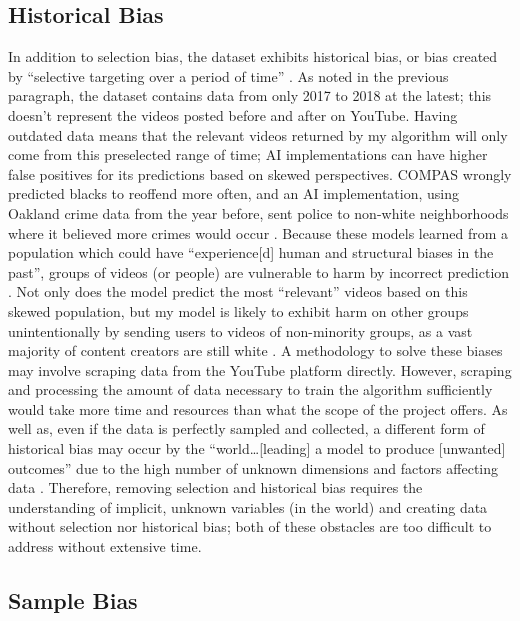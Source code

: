 \documentclass[10pt,twocolumn]{article}
\begin{document}
\subsection {Historical Bias}

In addition to selection bias, the dataset exhibits historical bias, or bias created by “selective targeting over a period of time” \cite{Fuchs2018}. As noted in the previous paragraph, the dataset contains data from only 2017 to 2018 at the latest; this doesn’t represent the videos posted before and after on YouTube. Having outdated data means that the relevant videos returned by my algorithm will only come from this preselected range of time; AI implementations can have higher false positives for its predictions based on skewed perspectives. COMPAS wrongly predicted blacks to reoffend more often, and an AI implementation, using Oakland crime data from the year before, sent police to non-white neighborhoods where it believed more crimes would occur \cite{fairness2017}. Because these models learned from a population which could have “experience[d] human and structural biases in the past”, groups of videos (or people) are vulnerable to harm by incorrect prediction \cite{Rajkomar2018}. Not only does the model predict the most “relevant” videos based on this skewed population, but my model is likely to exhibit harm on other groups unintentionally by sending users to videos of non-minority groups, as a vast majority of content creators are still white \cite{Zippia2021}. A methodology to solve these biases may involve scraping data from the YouTube platform directly. However, scraping and processing the amount of data necessary to train the algorithm sufficiently would take more time and resources than what the scope of the project offers. As well as, even if the data is perfectly sampled and collected, a different form of historical bias may occur by the “world…[leading] a model to produce [unwanted] outcomes” due to the high number of unknown dimensions and factors affecting data \cite{Hellstrom2020}. Therefore, removing selection and historical bias requires the understanding of implicit, unknown variables (in the world) and creating data without selection nor historical bias; both of these obstacles are too difficult to address without extensive time.

\subsection {Sample Bias}
\end{document}
